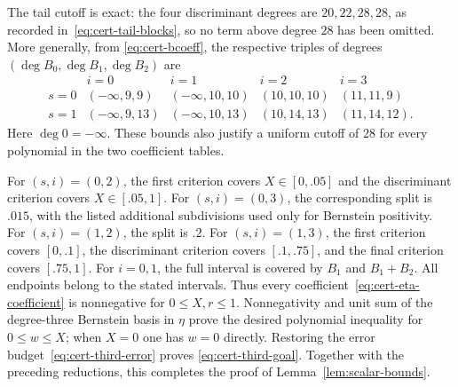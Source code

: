 The tail cutoff is exact: the four discriminant degrees are
$20,22,28,28$, as recorded in~\eqref{eq:cert-tail-blocks}, so no
term above degree $28$ has been omitted.  More generally, from
\eqref{eq:cert-bcoeff}, the respective triples of degrees
$(\deg B_0,\deg B_1,\deg B_2)$ are
\[
\begin{array}{c|rrrr}
 &i=0&i=1&i=2&i=3\\ \hline
 s=0&(-\infty,9,9)&(-\infty,10,10)&(10,10,10)&(11,11,9)\\
 s=1&(-\infty,9,13)&(-\infty,10,13)&(10,14,13)&(11,14,12).
\end{array}
\]
Here $\deg0=-\infty$.  These bounds also justify a uniform cutoff of
$28$ for every polynomial in the two coefficient tables.

For $(s,i)=(0,2)$, the first criterion covers $X\in[0,.05]$ and
the discriminant criterion covers $X\in[.05,1]$.
For $(s,i)=(0,3)$, the corresponding split is $.015$, with the
listed additional subdivisions used only for Bernstein positivity.
For $(s,i)=(1,2)$, the split is $.2$.
For $(s,i)=(1,3)$, the first criterion covers $[0,.1]$, the
discriminant criterion covers $[.1,.75]$, and the final criterion
covers $[.75,1]$.  For $i=0,1$, the full interval is covered by
$B_1$ and $B_1+B_2$.  All endpoints belong to the stated intervals.
Thus every coefficient~\eqref{eq:cert-eta-coefficient} is nonnegative
for $0\le X,r\le1$.  Nonnegativity and unit sum of the degree-three
Bernstein basis in $\eta$ prove the desired polynomial inequality
for $0\le w\le X$; when $X=0$ one has $w=0$ directly.
Restoring the error budget~\eqref{eq:cert-third-error} proves
\eqref{eq:cert-third-goal}.  Together with the preceding reductions,
this completes the proof of Lemma~\ref{lem:scalar-bounds}.
